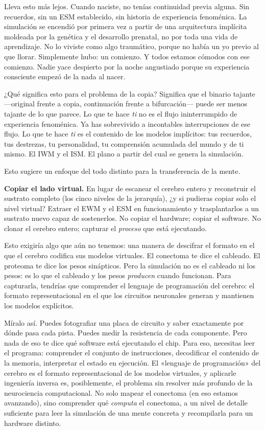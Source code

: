 \documentclass[11pt, twoside, openright]{book}
\begin{document}
Lleva esto más lejos. Cuando naciste, no tenías continuidad previa alguna. Sin recuerdos, sin un ESM establecido, sin historia de experiencia fenoménica. La simulación se encendió por primera vez a partir de una arquitectura implícita moldeada por la genética y el desarrollo prenatal, no por toda una vida de aprendizaje. No lo viviste como algo traumático, porque no había un yo previo al que llorar. Simplemente hubo: un comienzo. Y todos estamos cómodos con ese comienzo. Nadie yace despierto por la noche angustiado porque su experiencia consciente empezó de la nada al nacer.

¿Qué significa esto para el problema de la copia? Significa que el binario tajante ---original frente a copia, continuación frente a bifurcación--- puede ser menos tajante de lo que parece. Lo que te hace \textit{ti} no es el flujo ininterrumpido de experiencia fenoménica. Ya has sobrevivido a incontables interrupciones de ese flujo. Lo que te hace \textit{ti} es el contenido de los modelos implícitos: tus recuerdos, tus destrezas, tu personalidad, tu comprensión acumulada del mundo y de ti mismo. El IWM y el ISM. El plano a partir del cual se genera la simulación.

Esto sugiere un enfoque del todo distinto para la transferencia de la mente.

\textbf{Copiar el lado virtual.} En lugar de escanear el cerebro entero y reconstruir el sustrato completo (los cinco niveles de la jerarquía), ¿y si pudieras copiar solo el nivel virtual? Extraer el EWM y el ESM en funcionamiento y trasplantarlos a un sustrato nuevo capaz de sostenerlos. No copiar el hardware; copiar el software. No clonar el cerebro entero; capturar el \textit{proceso} que está ejecutando.

Esto exigiría algo que aún no tenemos: una manera de descifrar el formato en el que el cerebro codifica sus modelos virtuales. El conectoma te dice el cableado. El proteoma te dice los pesos sinápticos. Pero la simulación no es el cableado ni los pesos: es lo que el cableado y los pesos \textit{producen} cuando funcionan. Para capturarla, tendrías que comprender el lenguaje de programación del cerebro: el formato representacional en el que los circuitos neuronales generan y mantienen los modelos explícitos.

Míralo así. Puedes fotografiar una placa de circuito y saber exactamente por dónde pasa cada pista. Puedes medir la resistencia de cada componente. Pero nada de eso te dice qué software está ejecutando el chip. Para eso, necesitas leer el programa: comprender el conjunto de instrucciones, decodificar el contenido de la memoria, interpretar el estado en ejecución. El «lenguaje de programación» del cerebro es el formato representacional de los modelos virtuales, y aplicarle ingeniería inversa es, posiblemente, el problema sin resolver más profundo de la neurociencia computacional. No solo mapear el conectoma (en eso estamos avanzando), sino comprender qué \textit{computa} el conectoma, a un nivel de detalle suficiente para leer la simulación de una mente concreta y recompilarla para un hardware distinto.
\end{document}
